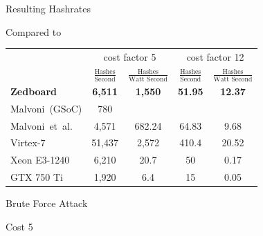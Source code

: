 \begin{frame}{Resulting Hashrates}
	\begin{block}{Compared to}
		\begin{table}[tp]
			\centering
			\begin{tabular}{l c c c c}
				\toprule
					& \multicolumn{2}{c}{cost factor 5} & \multicolumn{2}{c}{cost factor 12} \\
					& $\frac{\text{Hashes}}{\text{Second}}$
					& $\frac{\text{Hashes}}{\text{Watt Second}}$
					& $\frac{\text{Hashes}}{\text{Second}}$
					& $\frac{\text{Hashes}}{\text{Watt Second}}$
					\\
				\midrule
				{\bf Zedboard}  & {\bf 6,511} & {\bf 1,550} & {\bf 51.95} & {\bf 12.37} \\
				Malvoni~(GSoC)  &        780  &             &             &             \\
				Malvoni~et~al.  &      4,571  &      682.24 &      64.83  &       9.68  \\
				\midrule
				Virtex-7        &     51,437  &      2,572  &     410.4   &      20.52  \\
				\midrule
				Xeon E3-1240    &      6,210  &       20.7  &      50     &       0.17  \\
				GTX 750 Ti      &      1,920  &        6.4  &      15     &       0.05  \\
				\bottomrule
			\end{tabular}
		\end{table}
	\end{block}
\end{frame}

\begin{frame}{Brute Force Attack}
	\begin{block}{Cost 5}
		
	\end{block}
\end{frame}

%		

